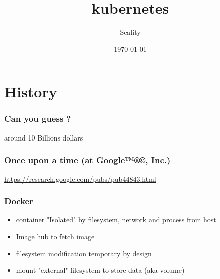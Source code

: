 \documentclass{beamer}
\title{kubernetes}
\author{Scality}
\date{\today}
\begin{document}
\maketitle{}

\section{History}

\begin{frame}
\frametitle{Can you guess ?}
\centering
\vfill
around 10 Billions dollars
\vfill
{}
\end{frame}

\begin{frame}
  \frametitle{Once upon a time (at Google{\tiny ™®©}, Inc.)}
  \begin{center}
  \href{https://research.google.com/pubs/pub44843.html}
       {https://research.google.com/pubs/pub44843.html}
  \vfill
  \end{center}
\end{frame}

\begin{frame}
  \frametitle{Docker}
  \begin{itemize}
    \item container "Isolated" by filesystem, network and process from host
    \item Image hub to fetch image
    \item filesystem modification temporary by design
    \item mount "external" filesystem to store data (aka volume)
  \end{itemize}
\end{frame}
\end{document}
